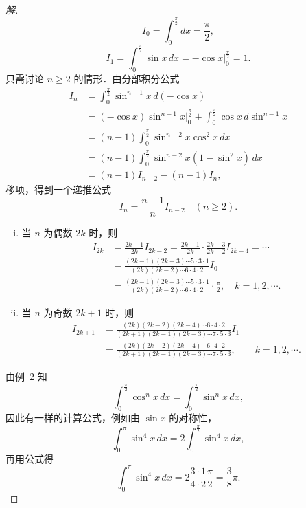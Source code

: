 \begin{proof}[解]
\[
I_0 = \int_0^{\frac{\pi}{2}}dx = \frac{\pi}{2},
\]
\[
I_1 = \int_0^{\frac{\pi}{2}}\sin x\,dx = -\cos x\bigg|_0^{\frac{\pi}{2}} = 1.
\]
只需讨论 $n \geqslant 2$ 的情形．由分部积分公式
\begin{align*}
I_n &= \int_0^{\frac{\pi}{2}}\sin^{n-1}x\,d(-\cos x) \\
&= (-\cos x)\sin^{n-1}x\bigg|_0^{\frac{\pi}{2}} + \int_0^{\frac{\pi}{2}}\cos x\,d\sin^{n-1}x \\
&= (n - 1)\int_0^{\frac{\pi}{2}}\sin^{n-2}x\cos^2 x\,dx \\
&= (n - 1)\int_0^{\frac{\pi}{2}}\sin^{n-2}x(1 - \sin^2 x)\,dx \\
&= (n - 1)I_{n-2} - (n - 1)I_n,
\end{align*}
移项，得到一个递推公式
\[
I_n = \frac{n-1}{n}I_{n-2} \quad (n \geqslant 2).
\]
\begin{enumerate}[(i)]
\item 当 $n$ 为偶数 $2k$ 时，则
\begin{align*}
I_{2k} &= \frac{2k-1}{2k}I_{2k-2} = \frac{2k-1}{2k}\cdot\frac{2k-3}{2k-2}I_{2k-4} = \cdots \\
&= \frac{(2k-1)(2k-3)\cdots 5\cdot 3\cdot 1}{(2k)(2k-2)\cdots 6\cdot 4\cdot 2}I_0 \\
&= \frac{(2k-1)(2k-3)\cdots 5\cdot 3\cdot 1}{(2k)(2k-2)\cdots 6\cdot 4\cdot 2}\cdot\frac{\pi}{2}, \quad k = 1, 2, \cdots.
\end{align*}
\item 当 $n$ 为奇数 $2k+1$ 时，则
\begin{align*}
I_{2k+1} &= \frac{(2k)(2k-2)(2k-4)\cdots 6\cdot 4\cdot 2}{(2k+1)(2k-1)(2k-3)\cdots 7\cdot 5\cdot 3}I_1 \\
&= \frac{(2k)(2k-2)(2k-4)\cdots 6\cdot 4\cdot 2}{(2k+1)(2k-1)(2k-3)\cdots 7\cdot 5\cdot 3}, \qquad k = 1, 2, \cdots.
\end{align*}
\end{enumerate}
由例~2 知
\[
\int_0^{\frac{\pi}{2}}\cos^n x\,dx = \int_0^{\frac{\pi}{2}}\sin^n x\,dx,
\]
因此有一样的计算公式，例如由 $\sin x$ 的对称性，
\[
\int_0^\pi \sin^4 x\,dx = 2\int_0^{\frac{\pi}{2}}\sin^4 x\,dx,
\]
再用公式得
\[
\int_0^\pi \sin^4 x\,dx = 2\frac{3\cdot 1}{4\cdot 2}\frac{\pi}{2} = \frac{3}{8}\pi.
\]
\end{proof}

